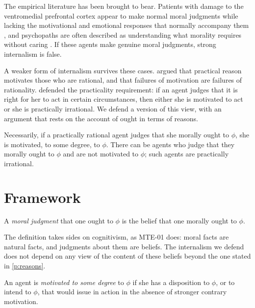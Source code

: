 \documentclass{situationist-preprint}
\begin{document}
The empirical literature has been brought to bear. Patients with damage to the ventromedial prefrontal cortex appear to make normal moral judgments while lacking the motivational and emotional responses that normally accompany them \citep{Roskies2003}, and psychopaths are often described as understanding what morality requires without caring \citep{Nichols2002}. If these agents make genuine moral judgments, strong internalism is false.

A weaker form of internalism survives these cases. \citet{Korsgaard1986} argued that practical reason motivates those who are rational, and that failures of motivation are failures of rationality. \citet{Smith1994} defended the practicality requirement: if an agent judges that it is right for her to act in certain circumstances, then either she is motivated to act or she is practically irrational. We defend a version of this view, with an argument that rests on the account of ought in terms of reasons.

\begin{principle}[Thesis]\label{p:thesis}
Necessarily, if a practically rational agent judges that she morally ought to $\phi$, she is motivated, to some degree, to $\phi$. There can be agents who judge that they morally ought to $\phi$ and are not motivated to $\phi$; such agents are practically irrational.
\end{principle}

\section{Framework}

\begin{definition}\label{d:judgment}
A \emph{moral judgment} that one ought to $\phi$ is the belief that one morally ought to $\phi$.
\end{definition}

The definition takes sides on cognitivism, as MTE-01 does: moral facts are natural facts, and judgments about them are beliefs. The internalism we defend does not depend on any view of the content of these beliefs beyond the one stated in \ref{p:reasons}.

\begin{definition}[Motivation]\label{d:motivation}
An agent is \emph{motivated to some degree} to $\phi$ if she has a disposition to $\phi$, or to intend to $\phi$, that would issue in action in the absence of stronger contrary motivation.
\end{definition}
\end{document}
